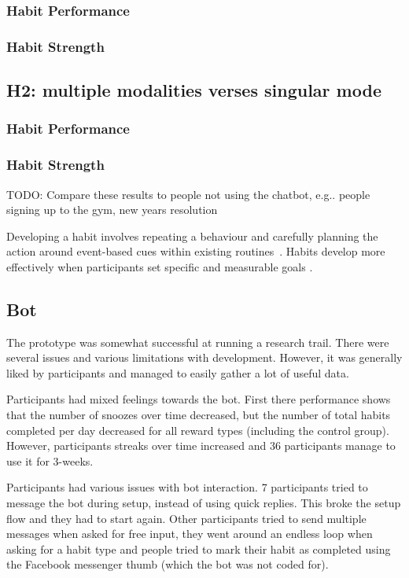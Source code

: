 \documentclass{scaffold/sigchi}
\begin{document}
\subsubsection{Habit Performance}

\subsubsection{Habit Strength}

\subsection{H2: multiple modalities verses singular mode}

\subsubsection{Habit Performance}

\subsubsection{Habit Strength}

TODO: Compare these results to people not using the chatbot, e.g.. people signing up to the gym, new years resolution

Developing a habit involves repeating a behaviour and carefully planning the action around event-based cues within existing routines~\cite{habits_event_cues_1, habits_event_cues_2}. Habits develop more effectively when participants set specific and measurable goals \cite{habits_better_when_have_specific_and_measurable_goals}.



\subsection{Bot}
The prototype was somewhat successful at running a research trail. There were several issues and various limitations with development. However, it was generally liked by participants and managed to easily gather a lot of useful data.

Participants had mixed feelings towards the bot. First there performance shows that the number of snoozes over time decreased, but the number of total habits completed per day decreased for all reward types (including the control group). However, participants streaks over time increased and 36 participants manage to use it for 3-weeks.

Participants had various issues with bot interaction. 7 participants tried to message the bot during setup, instead of using quick replies. This broke the setup flow and they had to start again. Other participants tried to send multiple messages when asked for free input, they went around an endless loop when asking for a habit type and people tried to mark their habit as completed using the Facebook messenger thumb (which the bot was not coded for).
\end{document}
